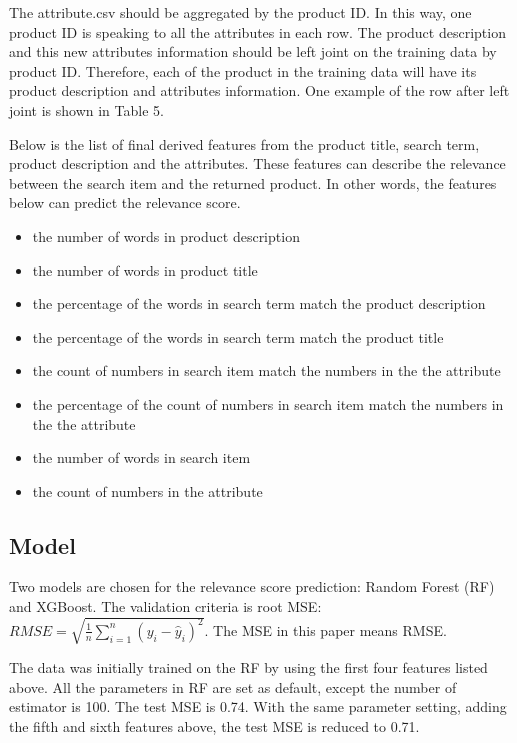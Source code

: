 \documentclass[11pt, titlepage]{article}
\begin{document}
\vspace{3mm} 
The attribute.csv should be aggregated by the product ID. In this way, one product ID is speaking to all the attributes in each row. The product description and this new attributes information should be left joint on the training data by product ID. Therefore, each of the product in the training data will have its product description and attributes information. One example of the row after left joint is shown in Table 5.

\vspace{3mm} 
Below is the list of final derived features from the product title, search term, product description and the attributes. These features can describe the relevance between the search item and the returned product. In other words, the features below can predict the relevance score. 
 
\begin{itemize}
\item the number of words in product description
\item the number of words in product title
\item the percentage of the words in search term match the product description
\item the percentage of the words in search term match the product title
\item the count of numbers in search item match the numbers in the the attribute 
\item the percentage of the count of numbers in search item match the numbers in the the attribute 
\item the number of words in search item
\item the count of numbers in the attribute
\end{itemize}


\subsection{Model}

Two models are chosen for the relevance score prediction: Random Forest (RF) and XGBoost. The validation criteria is root MSE: $RMSE = \sqrt{\frac{1}{n}\sum_{i=1}^n(y_i-\hat{y}_i)^2}$. The MSE in this paper means RMSE.

\vspace{3mm} 
The data was initially trained on the RF by using the first four features listed above. All the parameters in RF are set as default, except the number of estimator is 100. The test MSE is 0.74. With the same parameter setting, adding the fifth and sixth features above, the test MSE is reduced to 0.71.
\end{document}
